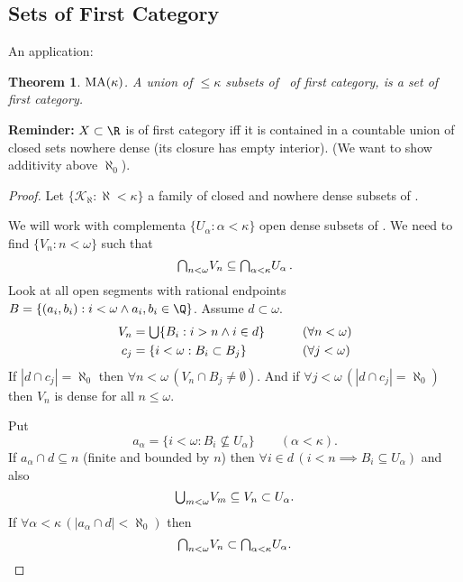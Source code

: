 \documentclass[11pt,pdftex,twoside,a4paper]{article}
\newcommand{\B}[1]{\textbf{#1}}
\newcommand{\MA}{\ensuremath{\mathop{\rm MA}\nolimits}}
\newtheorem{thm}{Theorem}[section]
\theoremstyle{definition}
\begin{document}
\subsection{Sets of First Category}

An application:
\begin{thm}
\(\MA(\kappa)\).
A union of \(\leq \kappa\) subsets of \R\ of first category, is a set of
first category.
\end{thm}
\B{Reminder:} \(X\subset\R\) is of first category iff
it is contained in a countable union of closed sets nowhere dense
(its closure has empty interior).
(We want to show additivity above \(\aleph_0\)).
\begin{proof}
Let \(\{\mathscr{K}_\aleph: \aleph < \kappa\}\) 
a family of closed and nowhere dense subsets of \R.
\iffalse
We need to find countable family of closed nowhere dense subsets
\(\{H_n: n < \omega\}\) such that
\begin{equation*}
\mathsmaller{\bigcup_{d<\kappa}} \mathscr{K}_d \subseteq 
  \mathsmaller{\bigcup_{n<\omega}} H_n.
\end{equation*}
\fi
We will work with complementa \(\{U_\alpha: \alpha<\kappa\}\)
open dense subsets of \R. We need to find \(\{V_n: n<\omega\}\)
such that 
\begin{equation*}
\mathsmaller{\bigcap_{n<\omega}} V_n \subseteq 
  \mathsmaller{\bigcap_{\alpha<\kappa}} U_\alpha\,.
\end{equation*}
Look at all open segments with rational endpoints
\(B=\{(a_i, b_i): i < \omega \land a_i,b_i \in \Q\}\).
Assume \(d\subset \omega\).
\begin{alignat*}{2}
V_n &= \mathsmaller{\bigcup} \{B_i: i > n \land i \in d\} 
  \qquad && (\forall n < \omega) \\
c_j &= \{i < \omega: B_i \subset B_j\}
  \qquad && (\forall j < \omega) \\
\end{alignat*}
If \(|d \cap c_j| = \aleph_0\) 
then \(\forall n < \omega\, (V_n \cap B_j \neq \emptyset)\).
And if \(\forall j < \omega\, (|d \cap c_j| = \aleph_0)\) 
then \(V_n\) is dense for all \(n \leq \omega\).

Put 
\begin{equation*}
a_\alpha = \{i < \omega: B_i \not\subseteq U_\alpha\} \qquad (\alpha < \kappa).
\end{equation*}
If \(a_\alpha \cap d \subseteq n\) (finite and bounded by $n$)
then \(\forall i\in d\,(i < n \implies B_i \subseteq U_\alpha)\)
and also 
\begin{equation*}
\mathsmaller{\bigcup_{m<\omega}} V_m \subseteq V_n \subset U_\alpha.
\end{equation*}
If \(\forall \alpha<\kappa\,(|a_\alpha \cap d|<\aleph_0)\)
then 
\begin{equation*}
\mathsmaller{\bigcap_{n<\omega}} V_n \subset
  \mathsmaller{\bigcap_{\alpha<\kappa}} U_\alpha .
\end{equation*}
\end{proof}
\end{document}
